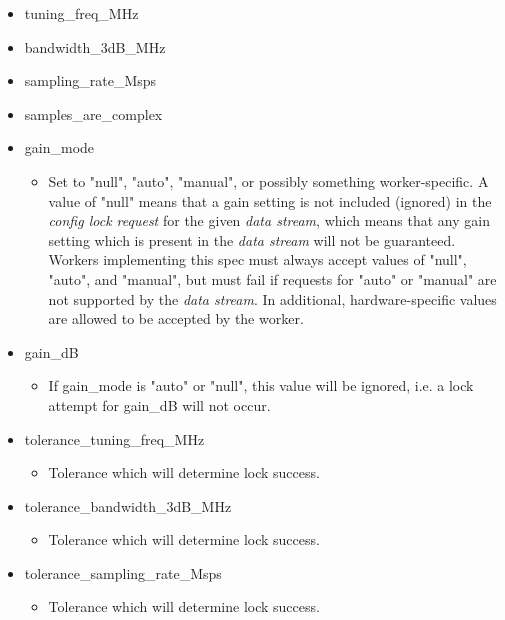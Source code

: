 \documentclass{article}
\begin{document}
\begin{itemize}
\begin{itemize}
\begin{itemize}
            \item tuning\_freq\_MHz
            \item bandwidth\_3dB\_MHz
            \item sampling\_rate\_Msps
            \item samples\_are\_complex
            \item gain\_mode
              \begin{itemize}
                \item Set to "null", "auto", "manual", or possibly something
                      worker-specific.
                      A value of "null" means that a gain setting is not
                      included (ignored)
                      in the \textit{config lock request}
                      for the given \textit{data stream}, which means that
                      any gain setting which is present in the
                      \textit{data stream} will not be guaranteed.
                      Workers implementing this spec must always accept values of
                      "null", "auto", and "manual", but must fail if requests
                      for "auto" or "manual" are not supported by the
                      \textit{data stream}.
                      In additional, hardware-specific values are allowed to be
                      accepted by the worker.
              \end{itemize}

            \item gain\_dB
              \begin{itemize}
                \item If gain\_mode is "auto" or "null", this value will be ignored, i.e. a
                lock attempt for gain\_dB will not occur.
              \end{itemize}

            \item tolerance\_tuning\_freq\_MHz
              \begin{itemize}
                \item Tolerance which will determine lock success.
              \end{itemize}
            \item tolerance\_bandwidth\_3dB\_MHz
              \begin{itemize}
                \item Tolerance which will determine lock success.
              \end{itemize}
            \item tolerance\_sampling\_rate\_Msps
              \begin{itemize}
                \item Tolerance which will determine lock success.
              \end{itemize}


\end{itemize}
\end{itemize}
\end{itemize}
\end{document}
